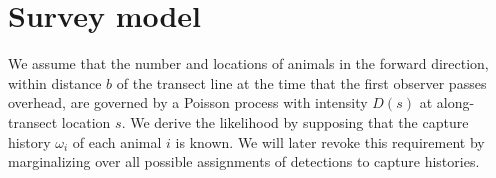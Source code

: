 \documentclass[useAMS, usenatbib, referee]{biom}\usepackage[]{graphicx}\usepackage[]{color}
\begin{document}


\section{Survey model}


We assume that the number and locations of animals in the forward direction, within distance $b$ of the transect line at the time that the first observer passes overhead, are governed by a Poisson process with intensity $D(s)$ at along-transect location $s$. We derive the likelihood by supposing that the capture history $\omega_i$ of each animal $i$ is known. We will later revoke this requirement by marginalizing over all possible assignments of detections to capture histories.

\end{document}
